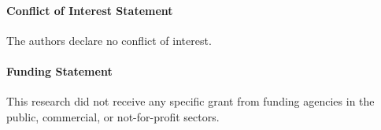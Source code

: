 \documentclass[12pt,a4paper]{article}
\begin{document}
\paragraph*{Conflict of Interest Statement}

The authors declare no conflict of interest.

\paragraph*{Funding Statement}

This research did not receive any specific grant from funding
agencies in the public, commercial, or not-for-profit sectors.

%

%
%
%
%

\end{document}
